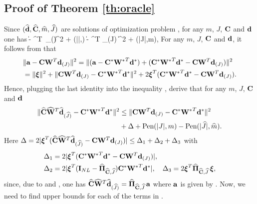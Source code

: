 


\subsection{Proof of Theorem \ref{th:oracle}}

%
Since $(\widehat{\mathbf{d}}, \widehat{\mathbf{C}}, \widehat{m}, \widehat{J})$ are solutions of optimization problem ,
for any $m$, $J$, $\mathbf{C}$  and $\mathbf{d}$ one has
\be \label{main_ineq}
\|\ba - \hbC \hbW^T\, \hbd_{(\hJ)}\|^2 + \Pen(|\hJ|,\hm) \leq \|\ba - \bC \bW^T \bd_{(J)} \|^2 + \Pen(|J|,m),
\ee 
For any $m$, $J$, $\mathbf{C}$  and $\mathbf{d}$, it follows from  that 
\begin{align*} 
& \|\ba -   \bC \bW^T  \bd_{(J)}\|^2  = \|(\ba - \bCs \bWs^T \bds) +  (\bCs \bWs^T \bds -  \bC \bW^T \bd_{(J)})\|^2 \\
& =   \|\bxi\|^2 + \|\bC \bW^T \bd_{(J)} - \bCs \bWs^T \bds\|^2 + 2 \bxi^T (\bCs \bWs^T \bds -  \bC \bW^T \bd_{(J)}).
\end{align*}
Hence, plugging the last identity into the inequality , derive that
for any $m$, $J$, $\mathbf{C}$  and $\mathbf{d}$
\begin{align} \label{main_ineq1}
\|\hbC \hbW^T \hbd_{(\hJ)} - \bCs \bWs^T \bds\|^2 & \leq \|\bC \bW^T \bd_{(J)} - \bCs \bWs^T \bds\|^2 \\
& +    \Del + \Pen(|J|,m) - \Pen(|\hJ|,\hm). \nonumber 
\end{align}
%
Here $\Del   = 2 |\bxi^T (\hbC \hbW^T \hbd_{(\hJ)} - \bC \bW^T \bd_{(J)})| \leq  \Del_1 + \Del_2 + \Del_3$ with 
\begin{align}
  \Del_1 & = 2 |\bxi^T (\bCs \bWs^T \bds - \bC \bW^T \bd_{(J)})|, \nonumber \\
  \Del_2  & = 2 |\bxi^T (\bI_{NL} - \hPhJ) \bCs \bWs^T \bds|, \quad 
  \Del_3   = 2  \bxi^T \hPhJ\, \bxi,  \label{Del123}
\end{align}
since, due to  and , one has  $\hbC \hbW^T \hbd_{(\hJ)} = \hPhJ\, \ba$ 
where $\mathbf{a}$ is given by . Now, we need to find upper bounds for each of the terms in .
 


